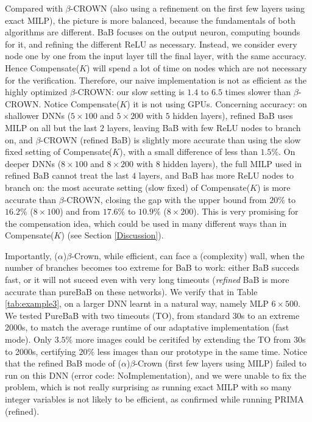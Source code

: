 \documentclass{llncs}
\begin{document}
Compared with $\beta$-CROWN (also using a refinement on the first few layers using exact MILP), the picture is more balanced, because the fundamentals of both algorithms are different. BaB focuses on the output neuron, computing bounds for it, and refining the different ReLU as necessary. Instead, we consider every node one by one from the input layer till the final layer, with the same accuracy. Hence Compensate($K$) will spend a lot of time on nodes which are not necessary for the verification. Therefore, our naive implementation is not as efficient as the highly optimized $\beta$-CROWN: our slow setting is $1.4$ to 
$6.5$ times slower than $\beta$-CROWN. Notice Compensate($K$) it is not using GPUs. 
Concerning accuracy: on shallower DNNs ($5 \times 100$ and $5 \times 200$ with $5$ hidden layers), refined BaB uses MILP on all but the last $2$ layers, leaving BaB with few ReLU nodes to branch on, and $\beta$-CROWN (refined BaB) is slightly more accurate than using the slow fixed setting of Compensate($K$), with a small difference of less than $1.5\%$. On deeper DNNs ($8 \times 100$ and $8 \times 200$ with $8$ hidden layers), the full MILP used in refined BaB cannot treat the last $4$ layers, and BaB has more ReLU nodes to branch on: 
the most accurate setting (slow fixed) of Compensate($K$) is more accurate than $\beta$-CROWN, closing the gap with the upper bound from $20\%$ to $16.2\%$ ($8 \times 100$)
and from $17.6\%$ to $10.9\%$ ($8 \times 200$). This is very promising for the compensation idea, which could be used in many different ways than in Compensate($K$) (see Section \ref{Discussion}).
 

\newpage

Importantly, ($\alpha$)$\beta$-Crown, while efficient, can face a (complexity) wall, when the number of branches becomes too extreme for BaB to work: either BaB succeds fast, or it will not suceed even with very long timeouts ({\em refined} BaB is more accurate than pureBaB on these networks). We verify that in Table \ref{tab:example3}, on a larger DNN learnt in a natural way, namely MLP $6 \times 500$.
We tested PureBaB with two timeouts (TO), from standard 30s to an extreme 2000s, to match the average runtime of our adaptative implementation (fast mode). Only $3.5\%$ more images could be ceritifed by extending the TO from 30s to 2000s, certifying $20\%$ less images than our prototype in the same time. Notice that the refined BaB mode of ($\alpha$)$\beta$-Crown (first few layers using MILP) failed to run on this DNN (error code: NoImplementation), and we were unable to fix the problem, which is not really surprising as running exact MILP with so many integer variables is not likely to be efficient, as confirmed while running PRIMA (refined).
\end{document}
